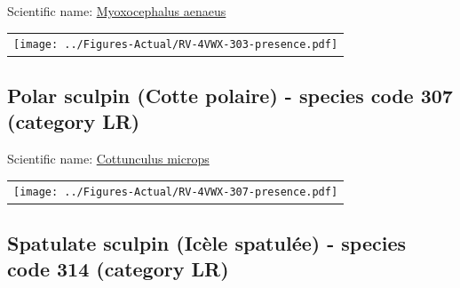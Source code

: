 \documentclass[12pt]{article}\usepackage[]{graphicx}\usepackage[]{color}
\begin{document}

Scientific name: \href{http://www.marinespecies.org/aphia.php?p=taxdetails\&id=159519}{Myoxocephalus aenaeus} \newline
\begin{minipage}{1.0\textwidth}
 \begin{tabular}{c}
\texttt{[image: ../Figures-Actual/RV-4VWX-303-presence.pdf]} \\ 
\end{tabular} 
\end{minipage}
\clearpage

\renewcommand\thefigure{\thesubsection\Alph{figure}}

\setcounter{figure}{0}

\hypertarget{sec:307}{%
\subsection{Polar sculpin (Cotte polaire) - species code 307 (category LR)}\label{sec:307}}

  


Scientific name: \href{http://www.marinespecies.org/aphia.php?p=taxdetails\&id=127235}{Cottunculus microps} \newline
\begin{minipage}{1.0\textwidth}
 \begin{tabular}{c}
\texttt{[image: ../Figures-Actual/RV-4VWX-307-presence.pdf]} \\ 
\end{tabular} 
\end{minipage}
\clearpage

\renewcommand\thefigure{\thesubsection\Alph{figure}}

\setcounter{figure}{0}

\hypertarget{sec:314}{%
\subsection{Spatulate sculpin (Icèle spatulée) - species code 314 (category LR)}\label{sec:314}}

  

\end{document}

